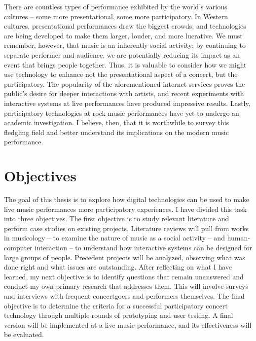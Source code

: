 There are countless types of performance exhibited by the world's various cultures -- some more presentational, some more participatory. In Western cultures, presentational performances draw the biggest crowds, and technologies are being developed to make them larger, louder, and more lucrative. We must remember, however, that music is an inherently social activity; by continuing to separate performer and audience, we are potentially reducing its impact as an event that brings people together. Thus, it is valuable to consider how we might use technology to enhance not the presentational aspect of a concert, but the participatory. The popularity of the aforementioned internet services proves the public's desire for deeper interactions with artists, and recent experiments with interactive systems at live performances have produced impressive results. Lastly, participatory technologies at rock music performances have yet to undergo an academic investigation. I believe, then, that it is worthwhile to survey this fledgling field and better understand its implications on the modern music performance.


\section{Objectives}

The goal of this thesis is to explore how digital technologies can be used to make live music performances more participatory experiences. I have divided this task into three objectives. The first objective is to study relevant literature and perform case studies on existing projects. Literature reviews will pull from works in musicology -- to examine the nature of music as a social activity -- and human-computer interaction -- to understand how interactive systems can be designed for large groups of people. Precedent projects will be analyzed, observing what was done right and what issues are outstanding. After reflecting on what I have learned, my next objective is to identify questions that remain unanswered and conduct my own primary research that addresses them. This will involve surveys and interviews with frequent concertgoers and performers themselves. The final objective is to determine the criteria for a successful participatory concert technology through multiple rounds of prototyping and user testing. A final version will be implemented at a live music performance, and its effectiveness will be evaluated.

